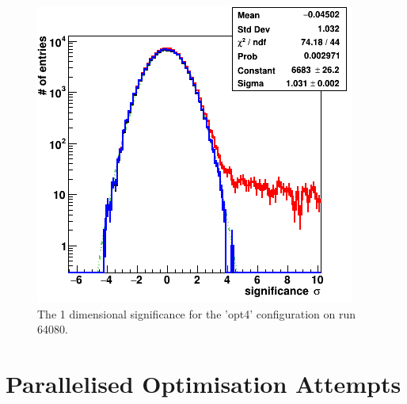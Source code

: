 \begin{figure}[ht] 
        \centering \includegraphics[width=\columnwidth]{figures/opt4_sig.png}

        \caption{
                \label{fig:opt4_sig1D} The 1 dimensional significance for the 'opt4' configuration on run 64080.
        }
\end{figure}

\section{Parallelised Optimisation Attempts}
